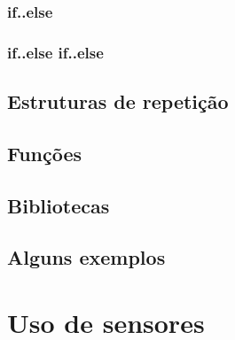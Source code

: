 \documentclass{report}
\begin{document}
	\subsubsection{if..else}
	
	\subsubsection{if..else if..else}
	
	\subsection{Estruturas de repetição}
	\subsection{Funções}
	\subsection{Bibliotecas}
	\subsection{Alguns exemplos}
	
	\section{Uso de sensores}

	

	
\end{document}
